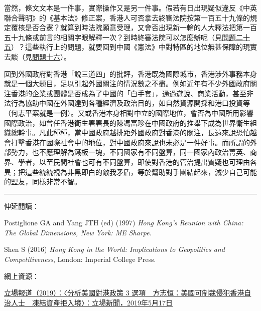 當然，條文文本是一件事，實際操作又是另一件事。假若有日出現疑似違反《中英聯合聲明》的《基本法》修正案，香港人可否拿去終審法院按第一百五十九條的規定覆核是否合憲？就算到時法院願意受理，又會否出現新一輪的人大釋法把第一百五十九條或前言的相關字眼解釋一次？到時終審法院可以怎麼辦呢（見\hyperref[sec:sec25]{問題二十五}）？這些執行上的問題，就要回到中國《憲法》中對特區的地位無甚保障的現實去談（見\hyperref[sec:sec16]{問題十六}）。


回到外國政府對香港「說三道四」的批評，香港既為國際城市，香港涉外事務本身就是一個大題目，足以引起外國關注的情況數之不盡。例如近年有不少外國政府關注香港的企業或團體是否成為了中國的「白手套」，通過遊說、商業活動，甚至非法行為協助中國在外國達到各種經濟及政治目的，如自然資源開採和港口投資等（何志平案就是一例）。又或香港本身相對中立的國際地位，會否為中國所用影響國際政治，如曾任香港衛生署署長的陳馮富珍在中國政府的推舉下成為世界衛生組織總幹事。凡此種種，當中國政府越排距外國政府對香港的關注，長遠來說恐怕越會打擊香港在國際社會中的地位，對中國政府來說也未必是一件好事。而所謂的外部勢力，也不應理解為鐵板一塊，不同國家有不同盤算，同一國家內政治菁英、商界、學者，以至民間社會也可有不同盤算，即使對香港的管治提出質疑也可理由各異；把這些統統視為非黑即白的敵我矛盾，等於幫助對手團結起來，減少自己可能的盟友，同樣非常不智。

\rule[-10pt]{15cm}{0.05em}

伸延閱讀：

Postiglione GA and Yang JTH (ed) (1997) \textit{Hong Kong’s Reunion with China: The Global Dimensions, New York: ME Sharpe}.

Shen S (2016) \textit{Hong Kong in the World: Implications to Geopolitics and Competitiveness}, London: Imperial College Press.

網上資源：

\href{https://thestandnews.com/politics/分析美國對港政策-3-選項-方志恒-美國可制裁侵犯香港自治人士-凍結資產拒入境/}{立場報道（2019）：〈分析美國對港政策 3 選項　方志恒：美國可制裁侵犯香港自治人士　凍結資產拒入境〉：立場新聞，2019年5月17日}
